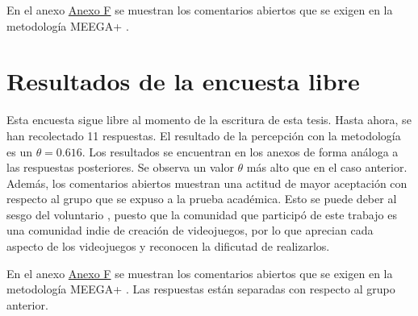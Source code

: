 En el anexo \hyperref[AnexoF]{Anexo F} se muestran los comentarios abiertos que se exigen en la metodología MEEGA+ \cite{meegaplus}.  

\section{Resultados de la encuesta libre}

Esta encuesta sigue libre al momento de la escritura de esta tesis. Hasta ahora, se han recolectado 11 respuestas. El resultado de la percepción con la metodología \cite{meegaplus} es un  $\theta = 0.616$. Los resultados se encuentran en los anexos de forma análoga a las respuestas posteriores. Se observa un valor $\theta$ más alto que en el caso anterior. Además, los comentarios abiertos muestran una actitud de mayor aceptación con respecto al grupo que se expuso a la prueba académica. Esto se puede deber al sesgo del voluntario \cite{volunterBias}, puesto que la comunidad que participó de este trabajo es una comunidad indie de creación de videojuegos, por lo que aprecian cada aspecto de los videojuegos y reconocen la dificutad de realizarlos.

En el anexo \hyperref[AnexoF]{Anexo F} se muestran los comentarios abiertos que se exigen en la metodología MEEGA+ \cite{meegaplus}. Las respuestas están separadas con respecto al grupo anterior. 
